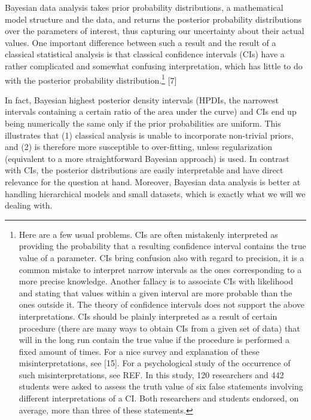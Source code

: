 \documentclass[
  10pt,
  dvipsnames,enabledeprecatedfontcommands]{scrartcl}
\begin{document}
Bayesian data analysis takes prior probability distributions, a
mathematical model structure and the data, and returns the posterior
probability distributions over the parameters of interest, thus
capturing our uncertainty about their actual values. One important
difference between such a result and the result of a classical
statistical analysis is that classical confidence intervals (CIs) have a
rather complicated and somewhat confusing interpretation, which has
little to do with the posterior probability distribution.\footnote{Here
  are a few usual problems. CIs are often mistakenly interpreted as
  providing the probability that a resulting confidence interval
  contains the true value of a parameter. CIs bring confusion also with
  regard to precision, it is a common mistake to interpret narrow
  intervals as the ones corresponding to a more precise knowledge.
  Another fallacy is to associate CIs with likelihood and stating that
  values within a given interval are more probable than the ones outside
  it. The theory of confidence intervals does not support the above
  interpretations. CIs should be plainly interpreted as a result of
  certain procedure (there are many ways to obtain CIs from a given set
  of data) that will in the long run contain the true value if the
  procedure is performed a fixed amount of times. For a nice survey and
  explanation of these misinterpretations, see {[}15{]}. For a
  psychological study of the occurrence of such misinterpretations, see
  REF. In this study, 120 researchers and 442 students were asked to
  assess the truth value of six false statements involving different
  interpretations of a CI. Both researchers and students endorsed, on
  average, more than three of these statements.} {[}7{]}

In fact, Bayesian highest posterior density intervals (HPDIs, the
narrowest intervals containing a certain ratio of the area under the
curve) and CIs end up being numerically the same only if the prior
probabilities are uniform. This illustrates that (1) classical analysis
is unable to incorporate non-trivial priors, and (2) is therefore more
susceptible to over-fitting, unless regularization (equivalent to a more
straightforward Bayesian approach) is used. In contrast with CIs, the
posterior distributions are easily interpretable and have direct
relevance for the question at hand. Moreover, Bayesian data analysis is
better at handling hierarchical models and small datasets, which is
exactly what we will we dealing with.
\end{document}
